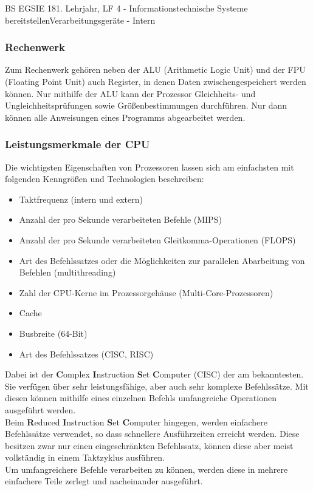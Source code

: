 \documentclass[oneside,openany,headings=optiontotoc,11pt,numbers=noenddot]{article}
\begin{document}
\begin{worksheet}{BS EGSIE 18}{1. Lehrjahr, LF 4 - Informationstechnische Systeme bereitstellen}{Verarbeitungsgeräte - Intern}
		\subsubsection*{Rechenwerk}
		Zum Rechenwerk gehören neben der ALU (Arithmetic Logic Unit) und der FPU (Floating Point Unit) auch Register, in denen Daten zwischengespeichert werden können. Nur mithilfe der ALU kann der Prozessor Gleichheits- und Ungleichheitsprüfungen sowie Größenbestimmungen durchführen. Nur dann können alle Anweisungen eines Programms abgearbeitet werden.
		\subsubsection{Leistungsmerkmale der CPU}
		Die wichtigsten Eigenschaften von Prozessoren lassen sich am einfachsten mit folgenden Kenngrößen und Technologien beschreiben:
		\begin{itemize}[label=-]
			\item Taktfrequenz (intern und extern)
			\item Anzahl der pro Sekunde verarbeiteten Befehle (MIPS)
			\item Anzahl der pro Sekunde verarbeiteten Gleitkomma-Operationen (FLOPS)
			\item Art des Befehlssatzes oder die Möglichkeiten zur parallelen Abarbeitung von Befehlen (multithreading)
			\item Zahl der CPU-Kerne im Prozessorgehäuse (Multi-Core-Prozessoren)
			\item Cache
			\item Busbreite (64-Bit)
			\item Art des Befehlssatzes (CISC, RISC)
		\end{itemize}
		Dabei ist der \textbf{C}omplex \textbf{I}nstruction \textbf{S}et \textbf{C}omputer (CISC) der am bekanntesten. Sie verfügen über sehr leistungsfähige, aber auch sehr komplexe Befehlssätze. Mit diesen können mithilfe eines einzelnen Befehls umfangreiche Operationen ausgeführt werden.\\
		Beim \textbf{R}educed \textbf{I}nstruction \textbf{S}et \textbf{C}omputer hingegen, werden einfachere Befehlssätze verwendet, so dass schnellere Ausführzeiten erreicht werden. Diese besitzen zwar nur einen eingeschränkten Befehlssatz, können diese aber meist vollständig in einem Taktzyklus ausführen.\\
		Um umfangreichere Befehle verarbeiten zu können, werden diese in mehrere einfachere Teile zerlegt und nacheinander ausgeführt.

\end{worksheet}
\end{document}
